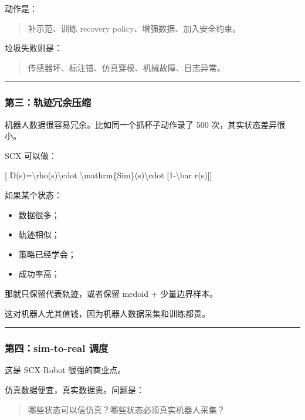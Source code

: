 \documentclass[
  12pt,
]{ctexart}
\providecommand{\tightlist}{%
  \setlength{\itemsep}{0pt}\setlength{\parskip}{0pt}}
\begin{document}
动作是：

\begin{quote}
补示范、训练 recovery policy、增强数据、加入安全约束。
\end{quote}

垃圾失败则是：

\begin{quote}
传感器坏、标注错、仿真穿模、机械故障、日志异常。
\end{quote}

\begin{center}\rule{0.5\linewidth}{0.5pt}\end{center}

\subsubsection{第三：轨迹冗余压缩}\label{ux7b2cux4e09ux8f68ux8ff9ux5197ux4f59ux538bux7f29}

机器人数据很容易冗余。比如同一个抓杯子动作录了 500
次，其实状态差异很小。

SCX 可以做：

{[} D(s)=\textbackslash rho(s)\textbackslash cdot
\textbackslash mathrm\{Sim\}(s)\textbackslash cdot
{[}1-\textbackslash bar r(s){]}{]}

如果某个状态：

\begin{itemize}
\tightlist
\item
  数据很多；
\item
  轨迹相似；
\item
  策略已经学会；
\item
  成功率高；
\end{itemize}

那就只保留代表轨迹，或者保留 medoid + 少量边界样本。

这对机器人尤其值钱，因为机器人数据采集和训练都贵。

\begin{center}\rule{0.5\linewidth}{0.5pt}\end{center}

\subsubsection{第四：sim-to-real
调度}\label{ux7b2cux56dbsim-to-real-ux8c03ux5ea6}

这是 SCX-Robot 很强的商业点。

仿真数据便宜，真实数据贵。问题是：

\begin{quote}
哪些状态可以信仿真？哪些状态必须真实机器人采集？
\end{quote}
\end{document}
